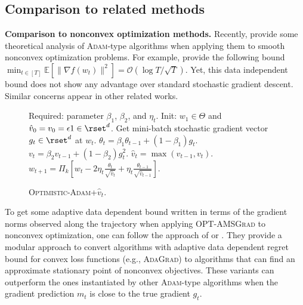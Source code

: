 \documentclass[wcp]{jmlr}
\begin{document}
\subsection{Comparison to related methods} \label{sec:related}


\textbf{Comparison to nonconvex optimization methods.}\hspace{0.1in}
Recently, \citep{ZRSKK18,CLSH19,WWB18,ZTYCG18,ZS18,LO18} provide some theoretical analysis of \textsc{Adam}-type algorithms when applying them to smooth nonconvex optimization problems. 
For example, \citep{CLSH19} provide the following bound $\min_{t \in [T]} \mathbb{E}[\| \nabla f(w_t) \|^2 ] = \mathcal{O}(\log T / \sqrt{T}) $.
Yet, this data independent bound does not show any advantage over standard stochastic gradient descent. 
Similar concerns appear in other related works.

\begin{figure}\vspace{-0.9cm}
\begin{minipage}{\linewidth}
\begin{algorithm}[H]
\begin{algorithmic}[1]
\caption{\textsc{Optimistic-Adam+$\hat{v}_t$}. \label{OPT-DISZ}}
\STATE Required: parameter $\beta_1$, $\beta_2$, and $\eta_t$.
\STATE Init: $w_1 \in \Theta$ and $\hat{v}_0 = v_{0} = \epsilon 1 \in \rset^{d}$.
\STATE Get mini-batch stochastic gradient vector $g_t \in \rset^d$ at $w_t$.
\STATE $\theta_t = \beta_{1} \theta_{t-1} + (1 - \beta_{1}) g_t$.
\STATE $v_t = \beta_2 v_{t-1} + (1 - \beta_2) g_t^2$.
\STATE $\hat{v}_t = \max( \hat{v}_{t-1} , v_t )$.
\STATE $w_{t+1} = \Pi_{k}[ w_{t} - 2 \eta_t \frac{\theta_t}{ \sqrt{\hat{v}_t }}
+ \eta_t \frac{\theta_{t-1}}{ \sqrt{\hat{v}_{t-1}} }]$.
\ENDFOR
\end{algorithmic}
\end{algorithm}
\vspace{-0.1in}
\end{minipage}\end{figure}
To get some adaptive data dependent bound written in terms of the gradient norms observed along the trajectory when applying  \textsc{OPT-AMSGrad} to nonconvex optimization, one can follow the approach of \citep{Princeton18} or \citep{CYYZC19}.
They provide a modular approach to convert algorithms with adaptive data dependent regret bound for convex loss functions (e.g., \textsc{AdaGrad}) to algorithms that can find an approximate stationary point of nonconvex objectives. 
These variants can outperform the ones instantiated by other \textsc{Adam}-type algorithms when the gradient prediction $m_t$ is close to the true gradient $g_t$.
\end{document}
